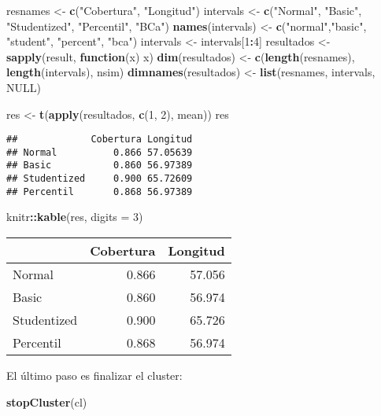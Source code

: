 \documentclass[
]{book}
\newenvironment{Shaded}{\begin{snugshade}}{\end{snugshade}}
\newcommand{\ControlFlowTok}[1]{\textcolor[rgb]{0.13,0.29,0.53}{\textbf{#1}}}
\newcommand{\DataTypeTok}[1]{\textcolor[rgb]{0.13,0.29,0.53}{#1}}
\newcommand{\DecValTok}[1]{\textcolor[rgb]{0.00,0.00,0.81}{#1}}
\newcommand{\KeywordTok}[1]{\textcolor[rgb]{0.13,0.29,0.53}{\textbf{#1}}}
\newcommand{\NormalTok}[1]{#1}
\newcommand{\OperatorTok}[1]{\textcolor[rgb]{0.81,0.36,0.00}{\textbf{#1}}}
\newcommand{\OtherTok}[1]{\textcolor[rgb]{0.56,0.35,0.01}{#1}}
\newcommand{\StringTok}[1]{\textcolor[rgb]{0.31,0.60,0.02}{#1}}
\theoremstyle{break}
\theoremstyle{definition}
\theoremstyle{definition}
\theoremstyle{definition}
\theoremstyle{remark}
\begin{document}
\begin{Shaded}
\begin{Highlighting}[]
\NormalTok{resnames <-}\StringTok{ }\KeywordTok{c}\NormalTok{(}\StringTok{"Cobertura"}\NormalTok{, }\StringTok{"Longitud"}\NormalTok{)}
\NormalTok{intervals <-}\StringTok{ }\KeywordTok{c}\NormalTok{(}\StringTok{"Normal"}\NormalTok{, }\StringTok{"Basic"}\NormalTok{, }\StringTok{"Studentized"}\NormalTok{, }\StringTok{"Percentil"}\NormalTok{, }\StringTok{"BCa"}\NormalTok{)}
\KeywordTok{names}\NormalTok{(intervals) <-}\StringTok{ }\KeywordTok{c}\NormalTok{(}\StringTok{"normal"}\NormalTok{,}\StringTok{"basic"}\NormalTok{, }\StringTok{"student"}\NormalTok{, }\StringTok{"percent"}\NormalTok{, }\StringTok{"bca"}\NormalTok{)}
\NormalTok{intervals <-}\StringTok{ }\NormalTok{intervals[}\DecValTok{1}\OperatorTok{:}\DecValTok{4}\NormalTok{]}
\NormalTok{resultados <-}\StringTok{ }\KeywordTok{sapply}\NormalTok{(result, }\ControlFlowTok{function}\NormalTok{(x) x)}
\KeywordTok{dim}\NormalTok{(resultados) <-}\StringTok{ }\KeywordTok{c}\NormalTok{(}\KeywordTok{length}\NormalTok{(resnames), }\KeywordTok{length}\NormalTok{(intervals), nsim)}
\KeywordTok{dimnames}\NormalTok{(resultados) <-}\StringTok{ }\KeywordTok{list}\NormalTok{(resnames, intervals, }\OtherTok{NULL}\NormalTok{)}

\NormalTok{res <-}\StringTok{ }\KeywordTok{t}\NormalTok{(}\KeywordTok{apply}\NormalTok{(resultados, }\KeywordTok{c}\NormalTok{(}\DecValTok{1}\NormalTok{, }\DecValTok{2}\NormalTok{), mean))}
\NormalTok{res}
\end{Highlighting}
\end{Shaded}

\begin{verbatim}
##             Cobertura Longitud
## Normal          0.866 57.05639
## Basic           0.860 56.97389
## Studentized     0.900 65.72609
## Percentil       0.868 56.97389
\end{verbatim}

\begin{Shaded}
\begin{Highlighting}[]
\NormalTok{knitr}\OperatorTok{::}\KeywordTok{kable}\NormalTok{(res, }\DataTypeTok{digits =} \DecValTok{3}\NormalTok{)}
\end{Highlighting}
\end{Shaded}

\begin{tabular}{l|r|r}
\hline
  & Cobertura & Longitud\\
\hline
Normal & 0.866 & 57.056\\
\hline
Basic & 0.860 & 56.974\\
\hline
Studentized & 0.900 & 65.726\\
\hline
Percentil & 0.868 & 56.974\\
\hline
\end{tabular}

El último paso es finalizar el cluster:

\begin{Shaded}
\begin{Highlighting}[]
\KeywordTok{stopCluster}\NormalTok{(cl)}
\end{Highlighting}
\end{Shaded}

  
\end{document}
